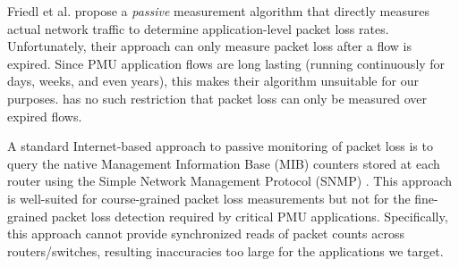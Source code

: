 
Friedl et al. \cite{Friedl09} propose a \emph{passive} measurement algorithm that directly measures actual network traffic to determine application-level packet loss rates. 
Unfortunately, their approach can only measure packet loss after a flow is expired.  
Since PMU application flows are long lasting (running continuously for days, weeks, and even years), this makes their algorithm unsuitable for our purposes.
\pcnt has no such restriction that packet loss can only be measured over expired flows.






A standard Internet-based approach to passive monitoring of packet loss is to query the native Management Information Base (MIB) counters stored at each router using the Simple Network
Management Protocol (SNMP) \cite{Barford04}. This approach is well-suited for course-grained packet loss measurements but not for the fine-grained packet loss detection required
by critical PMU applications.  Specifically, this approach cannot provide synchronized reads of packet counts across routers/switches, resulting inaccuracies too large for the applications
we target.

